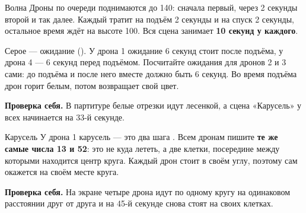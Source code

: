 \documentclass[a4paper,11pt]{scrartcl}
\begin{document}
\begin{zadanie}{Волна}
Дроны по очереди поднимаются до 140\cm: сначала первый, через 2 секунды второй и так далее. Каждый тратит на подъём 2 секунды и на спуск 2 секунды, остальное время ждёт на высоте 100\cm. Вся сцена занимает \textbf{10 секунд у каждого}.

\begin{center}
\end{center}

Серое — ожидание (). У дрона 1 ожидание 6 секунд стоит после подъёма, у дрона 4 — 6 секунд перед подъёмом. Посчитайте ожидания для дронов 2 и 3 сами: до подъёма и после него вместе должно быть 6 секунд. Во время подъёма дрон горит белым, потом возвращает свой цвет.

\textbf{Проверка себя.} В партитуре белые отрезки идут лесенкой, а сцена «Карусель» у всех начинается на 33-й секунде.
\end{zadanie}

\begin{zadanie}{Карусель}
У дрона 1 карусель — это два шага . Всем дронам пишите \textbf{те же самые числа 13 и 52}: это не куда лететь, а две клетки, посередине между которыми находится центр круга. Каждый дрон стоит в своём углу, поэтому сам окажется на своём месте круга.

\textbf{Проверка себя.} На экране четыре дрона идут по одному кругу на одинаковом расстоянии друг от друга и на 45-й секунде снова стоят на своих клетках.
\end{zadanie}
\end{document}

